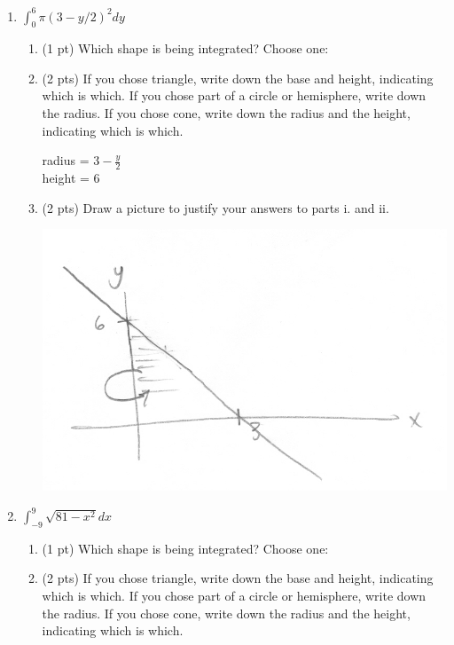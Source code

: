 \documentclass[11pt,letterpaper]{article}
\begin{document}
\begin{enumerate}
\smallskip
\begin{enumerate} 
\item $\int_0^6\pi(3-y/2)^2dy$
\smallskip
\begin{enumerate}
\item (1 pt) Which shape is being integrated?  Choose one:
\smallskip
\item (2 pts) If you chose triangle, write down the base and height, indicating which is which.  If you chose part of a circle or hemisphere, write down the radius.  If you chose cone, write down the radius and the height, indicating which is which.

\vspace{0.5pc}
radius = $3-\frac{y}{2}$ \\
height = $6$

\vspace{0.5pc}
\item (2 pts) Draw a picture to justify your answers to parts i. and ii.
\smallskip
\begin{center}
\includegraphics[width=.2\textwidth]{scan0011.jpg}
\end{center}
\vspace{1pc}
\end{enumerate}

\item $\int_{-9}^9\sqrt{81-x^2}dx$
\smallskip
\begin{enumerate}
\item (1 pt) Which shape is being integrated?  Choose one:
\smallskip
\item (2 pts) If you chose triangle, write down the base and height, indicating which is which.  If you chose part of a circle or hemisphere, write down the radius.  If you chose cone, write down the radius and the height, indicating which is which.


\end{enumerate}
\end{enumerate}
\end{enumerate}
\end{document}
